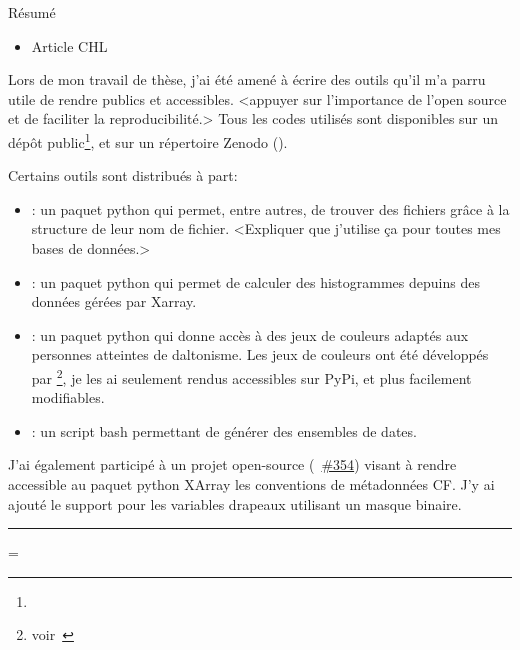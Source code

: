 
Résumé


\clearpage
{}
\label{sec:productions}

\begin{itemize}
        \item Article CHL
\end{itemize}
\medskip

Lors de mon travail de thèse, j'ai été amené à écrire des outils qu'il m'a parru utile de rendre publics et accessibles.
<appuyer sur l'importance de l'open source et de faciliter la reproducibilité.>
Tous les codes utilisés sont disponibles sur un dépôt public\footnote{%
}, et sur un répertoire Zenodo ().
\medskip

Certains outils sont distribués à part:
\begin{itemize}
  \item {}:
        un paquet python qui permet, entre autres, de trouver des fichiers grâce à la structure de leur nom de fichier.
        <Expliquer que j'utilise ça pour toutes mes bases de données.>
  \item {}:
        un paquet python qui permet de calculer des histogrammes depuins des données gérées par Xarray.
  \item {}:
        un paquet python qui donne accès à des jeux de couleurs adaptés aux personnes atteintes de daltonisme. Les jeux de couleurs ont été développés par \footnote{voir~}, je les ai seulement rendus accessibles sur PyPi, et plus facilement modifiables.
  \item {}:
        un script bash permettant de générer des ensembles de dates.
\end{itemize}
\medskip

J'ai également participé à un projet open-source (~\href{https://github.com/xarray-contrib/cf-xarray/pull/354}{\#354}) visant à rendre accessible au paquet python XArray les conventions de métadonnées CF.\@
J'y ai ajouté le support pour les variables drapeaux utilisant un masque binaire.

\begin{center}
  \vspace{1\baselineskip}
  \rule{0.77\textwidth}{0.5pt}
  \vspace{1\baselineskip}
\end{center}

{%
  \raggedright%
  \emergencystretch=\textwidth
  \printbibliography[heading=none, type=software, keyword=personnal]
}

